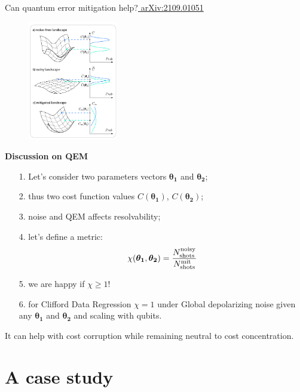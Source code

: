 \documentclass[8pt, xcolor={svgnames}, hyperref={linkcolor=black}, aspectratio=169]{beamer}
\begin{document}
\begin{frame}{Can quantum error mitigation help?\hfill \href{https://arxiv.org/abs/2109.01051}{\faBook\,\,arXiv:2109.01051}}
\begin{multicols}{2}
\begin{figure}
    \includegraphics[width=0.35\textwidth, height=0.8\textheight]{figures/NIBP_cropped.pdf}
\end{figure}
\pause
\textbf{Discussion on QEM}
\pause
\begin{itemize}[noitemsep]
\item[1.] Let's consider two parameters vectors $\bm{\theta_1}$ and $\bm{\theta_2}$;
\pause
\item[2.] thus two cost function values $C(\bm{\theta_1})$, $C(\bm{\theta_2})$;
\pause
\item[3.] noise and QEM affects resolvability;
\pause
\item[4.] let's define a metric: 
\vspace{-0.2cm}
$$ \chi(\bm{\theta_1}, \bm{\theta_2}) = \frac{N_{\rm shots}^{\rm noisy}}{N_{\rm shots}^{\rm mit}}$$
\pause
\vspace{-0.5cm}
\item[5.] we are happy if $\chi \geq 1$!
\pause
\item[6.] for Clifford Data Regression $\chi=1$ under Global depolarizing noise given 
any $\bm{\theta_1}$ and $\bm{\theta_2}$ and scaling with qubits.
\end{itemize}
\pause
\begin{tcolorbox}[colback=blue!20, title=Good news!]
It can help with cost corruption while remaining neutral to cost concentration.
\end{tcolorbox}
\end{multicols}
\end{frame}


\section{A case study}
\end{document}
